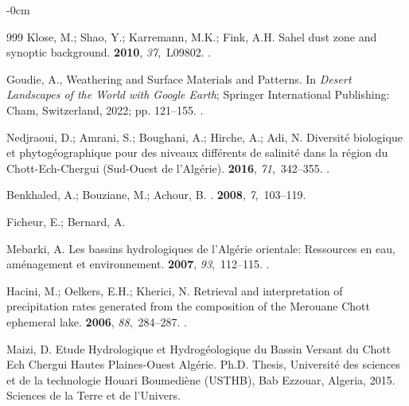 \documentclass[asi,article,accept,pdftex,moreauthors]{Definitions/mdpi}
\begin{document}
\begin{adjustwidth}{-\extralength}{0cm}
\begin{thebibliography}{999}
Klose, M.; Shao, Y.; Karremann, M.K.; Fink, A.H.
\newblock Sahel dust zone and synoptic background.
 {\bf 2010}, {\em 37},~L09802.
.

Goudie, A., Weathering and Surface Materials and Patterns.
\newblock In {\em Desert Landscapes of the World with Google Earth}; Springer
  International Publishing: Cham,  Switzerland, 2022; pp. 121--155.
.

Nedjraoui, D.; Amrani, S.; Boughani, A.; Hirche, A.; Adi, N.
\newblock Diversité biologique et phytogéographique pour des niveaux
  différents de salinité dans la région du Chott-Ech-Chergui (Sud-Ouest de
  l’Algérie).
 {\bf 2016}, {\em
  71},~342--355.
.

Benkhaled, A.; Bouziane, M.; Achour, B.
.
 {\bf 2008}, {\em 7},~103--119.

Ficheur, E.; Bernard, A.
\newblock {}

Mebarki, A.
\newblock Les bassins hydrologiques de l’Algérie orientale: Ressources en
  eau, aménagement et environnement.
 {\bf 2007}, {\em 93},~112--115.
.

Hacini, M.; Oelkers, E.H.; Kherici, N.
\newblock Retrieval and interpretation of precipitation rates generated from
  the composition of the Merouane Chott ephemeral lake. %
 {\bf 2006}, {\em
  88},~284--287.
.

Maizi, D.
\newblock Etude Hydrologique et Hydrogéologique du Bassin Versant du Chott Ech
  Chergui Hautes Plaines-Ouest Algérie.
\newblock Ph.D. Thesis, Université des sciences et de la technologie Houari
  Boumediène (USTHB), Bab Ezzouar, Algeria,  2015.
Sciences de la Terre et de l’Univers.


\end{thebibliography}
\end{adjustwidth}
\end{document}
